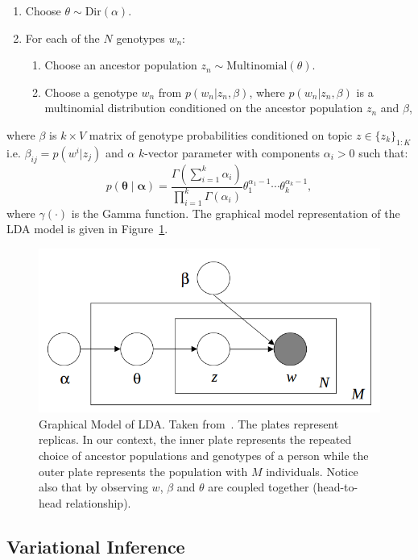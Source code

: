\documentclass[a4paper]{article}
\begin{document}
	\begin{enumerate}[noitemsep]
		\item Choose $\theta \sim \mathrm{Dir}(\alpha)$.
		\item For each of the $N$ genotypes $w_n$:
		\begin{enumerate}[noitemsep]
			\item Choose an ancestor population $z_n \sim \mathrm{Multinomial}(\theta)$.
			\item Choose a genotype $w_n$ from $p(w_n|z_n,\beta)$, where $p(w_n|z_n,\beta)$ is a multinomial distribution conditioned on the ancestor population $z_n$ and $\beta$,
		\end{enumerate}
	\end{enumerate}
	\noindent where $\beta$ is $k \times V$ matrix of genotype probabilities conditioned on topic $z \in \{z_k\}_{1:K}$ i.e. $\beta_{ij} = p(w^i|z_j)$ and $\alpha$ $k$-vector parameter with components $\alpha_i > 0$ such that:
	\begin{equation}
		p(\mathbf{\theta} \mid \mathbf{\alpha}) = \frac{\Gamma\left(\sum_{i=1}^{k} \alpha_{i}\right)}{\prod_{i=1}^{k} \Gamma\left(\alpha_{i}\right)} \theta_{1}^{\alpha_{1}-1} \cdots \theta_{k}^{\alpha_{k}-1},
	\end{equation}
	\noindent where $\gamma(\cdot)$ is the Gamma function. The graphical model representation of the LDA model is given in Figure~\ref{fig:ldagraphical}.
	
	
	\begin{figure}[ht]
		\centering
		\captionsetup{width=.8\linewidth}
		\includegraphics[width=0.6\linewidth]{images/lda_graphical}
		\caption{Graphical Model of LDA. Taken from~\cite{blei2003latent}. The plates represent replicas. In our context, the inner plate represents the repeated choice of ancestor populations and genotypes of a person while the outer plate represents the population with $M$ individuals. Notice also that by observing $w$, $\beta$ and $\theta$ are coupled together (head-to-head relationship).}
		\label{fig:ldagraphical}
	\end{figure}

	\subsection{Variational Inference}
	
\end{document}
